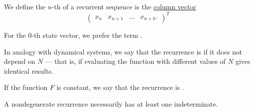 \begin{definition}
\begin{thmenum}
     We define the \( n \)-th  of a recurrent sequence is the \hyperref[def:array/column_vector]{column vector}
    \begin{equation*}
      \begin{pmatrix}
        x_n & x_{n+1} & \ldots & x_{n+k}.
      \end{pmatrix}^T
    \end{equation*}

    For the \( 0 \)-th state vector, we prefer the term .

     In analogy with dynamical systems, we say that the recurrence is  if it does not depend on \( N \) --- that is, if evaluating the function with different values of \( N \) gives identical results.

     If the function \( F \) is constant, we say that the recurrence is .

    A nondegenerate recurrence necessarily has at least one indeterminate.
  \end{thmenum}
\end{definition}
